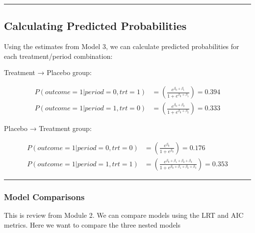 \documentclass[
  letterpaper,
  DIV=11,
  numbers=noendperiod]{scrreprt}
\begin{document}
\begin{center}\rule{0.5\linewidth}{0.5pt}\end{center}

\hypertarget{calculating-predicted-probabilities}{%
\subsection*{Calculating Predicted
Probabilities}\label{calculating-predicted-probabilities}}

Using the estimates from Model 3, we can calculate predicted
probabilities for each treatment/period combination:

Treatment → Placebo group:

\[
\begin{align*}
P(outcome = 1|period=0, trt=1) &= \left(\frac{e^{\beta_0 + \beta_1}}{1 + e^{\beta_0 + \beta_1}}\right) = 0.394\\
P(outcome = 1|period=1, trt=0) &= \left(\frac{e^{\beta_0 + \beta_2}}{1 + e^{\beta_0 + \beta_2}}\right) = 0.333
\end{align*}
\]

Placebo → Treatment group:

\[
\begin{align*}
P(outcome = 1|period=0, trt=0) &= \left(\frac{e^{\beta_0 }}{1 + e^{\beta_0 }}\right) = 0.176\\
P(outcome = 1|period=1, trt=1) &= \left(\frac{e^{\beta_0 + \beta_1 + \beta_2 + \beta_3}}{1 + e^{\beta_0 + \beta_1 + \beta_2 + \beta_3}}\right) = 0.353
\end{align*}
\]

\begin{center}\rule{0.5\linewidth}{0.5pt}\end{center}

\hypertarget{model-comparisons}{%
\subsubsection*{Model Comparisons}\label{model-comparisons}}

This is review from Module 2. We can compare models using the LRT and
AIC metrics. Here we want to compare the three nested models
\end{document}
